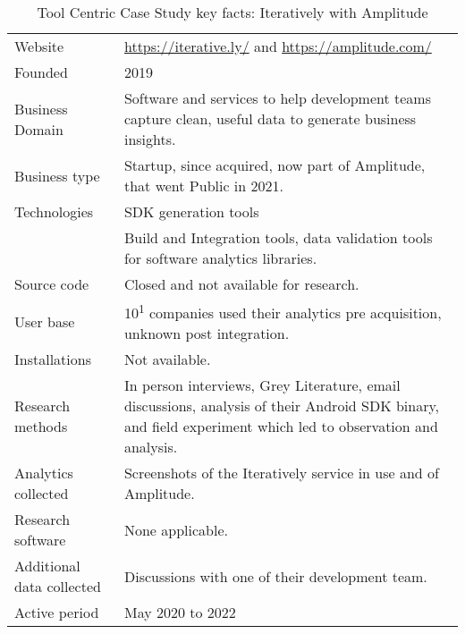 {\renewcommand{\arraystretch}{0.8}%
\begin{table}[htbp!]
    \centering
    \small
    \setlength{\tabcolsep}{1pt}
    \begin{tabular}{lp{9cm}}
       \toprule
       Website &\url{https://iterative.ly/} and \url{https://amplitude.com/} \\
       Founded & 2019 \\ %
       Business Domain & Software and services to help development teams capture clean, useful data to generate business insights. \\ %
       Business type & Startup, since acquired, now part of Amplitude, that went Public in 2021. \\
       Technologies  & SDK generation tools \\
       & Build and Integration tools, data validation tools for software analytics libraries. \\
       Source code  &Closed and not available for research. \\
       \midrule
       User base & 10\textsuperscript{1} companies used their analytics pre acquisition, unknown post integration. \\
       Installations & Not available.  \\
       \midrule
       Research methods &In person interviews, Grey Literature, email discussions, analysis of their Android SDK binary, and field experiment which led to observation and analysis. \\
       Analytics collected & Screenshots of the Iteratively service in use and of Amplitude. \\
       Research software & None applicable. \\
       Additional data collected &Discussions with one of their development team. \\
       Active period & May 2020 to 2022 \\
       \bottomrule
    \end{tabular}
    \caption{Tool Centric Case Study key facts: Iteratively with Amplitude}
    \label{tab:iteratively_with_amplitude_anaytics_overview}
\end{table}
}


